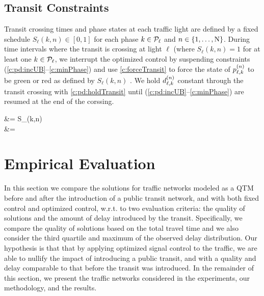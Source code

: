 \subsection{Transit Constraints}

Transit crossing times and phase states at each traffic light are defined by a fixed schedule $S_{\ell}(k,n) \in [0,1]$ for each phase $k \in \Pset_\tl$ and $n \in \{1,\dots,\Nn\}$. During time intervals where the transit is crossing at light $\ell$ (where $S_{\ell}(k,n)=1$ for at least one $k \in \Pset_\tl$, we interrupt the optimized control by suspending constraints (\ref{c:pd:incUB}--\ref{c:minPhase}) and use \eqref{c:forceTransit} to force the state of $\p[n]{\ell}{k}$ to be green or red as defined by $S_{\ell}(k,n)$ . We hold $\pd{\ell}{k}$ constant through the transit crossing with \eqref{c:pd:holdTransit} until (\ref{c:pd:incUB}--\ref{c:minPhase}) are resumed at the end of the corssing.
\begin{cAlign}
%
 &= S_{\ell}(k,n)\\
%
 &= 
\end{cAlign}
 
\section{Empirical Evaluation}
  
In this section we compare the solutions for traffic networks modeled as a QTM
before and after the introduction of a public transit network, and with both fixed control
and optimized control, w.r.t. to two evaluation criteria:
the quality of solutions and the amount of delay introduced by the transit.
%
%
%
Specifically, we compare the quality of solutions based on the total travel time and we also
consider the third quartile and maximum of the observed delay distribution.
%
%
%
Our hypothesis is that that by applying optimized signal control to the traffic,
we are able to nullify the impact of introducing a public transit, and with a quality 
and delay comparable to that before the transit was introduced.
%
In the remainder of this section, we present the traffic networks considered in
the experiments, our methodology, and the results.



